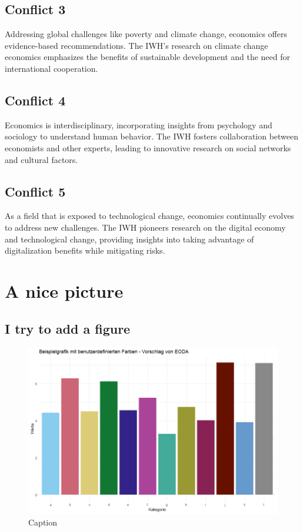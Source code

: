 \documentclass{article}
\begin{document}
\subsection{Conflict 3}
Addressing global challenges like poverty and climate change, economics offers evidence-based recommendations. The IWH's research on climate change economics emphasizes the benefits of sustainable development and the need for international cooperation.

\subsection{Conflict 4}
Economics is interdisciplinary, incorporating insights from psychology and sociology to understand human behavior. The IWH fosters collaboration between economists and other experts, leading to innovative research on social networks and cultural factors.

\subsection{Conflict 5}
As a field that is exposed to technological change, economics continually evolves to address new challenges. The IWH pioneers research on the digital economy and technological change, providing insights into taking advantage of digitalization benefits while mitigating risks.


\section{A nice picture}
\subsection{I try to add a figure}
\begin{figure}[h]
  \centering
  \includegraphics[width=\textwidth]{figures/efn/plot_example.png}
  \caption{Caption}
\end{figure}
\end{document}
